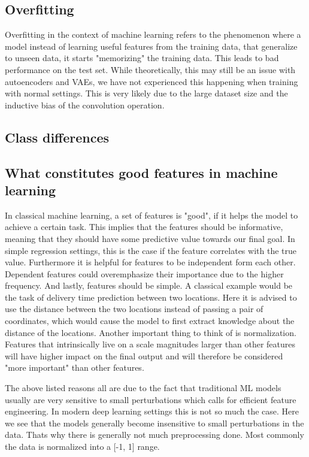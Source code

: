 \subsection{Overfitting}
Overfitting in the context of machine learning refers to the phenomenon where
a model instead of learning useful features from the training data, that
generalize to unseen data, it starts "memorizing" the training data. This
leads to bad performance on the test set. While theoretically, this may still
be an issue with autoencoders and VAEs, we have not experienced this happening
when training with normal settings. This is very likely due to the large
dataset size and the inductive bias of the convolution operation.

\subsection{Class differences}

\subsection{What constitutes good features in machine learning}
In classical machine learning, a set of features is "good", if it helps the
model to achieve a certain task. This implies that the features should be
informative, meaning that they should have some predictive value towards our
final goal. In simple regression settings, this is the case if the feature
correlates with the true value. Furthermore it is helpful for features to be
independent form each other. Dependent features could overemphasize their
importance due to the higher frequency. And lastly, features should be simple.
A classical example would be the task of delivery time prediction between two
locations. Here it is advised to use the distance between the two locations
instead of passing a pair of coordinates, which would cause the model to first
extract knowledge about the distance of the locations. Another important thing
to think of is normalization. Features that intrinsically live on a scale
magnitudes larger than other features will have higher impact on the final
output and will therefore be considered "more important" than other features.

The above listed reasons all are due to the fact that traditional ML models
usually are very sensitive to small perturbations which calls for efficient
feature engineering. In modern deep learning settings this is not so much the
case. Here we see that the models generally become insensitive to small
perturbations in the data. Thats why there is generally not much preprocessing
done. Most commonly the data is normalized into a [-1, 1] range.
